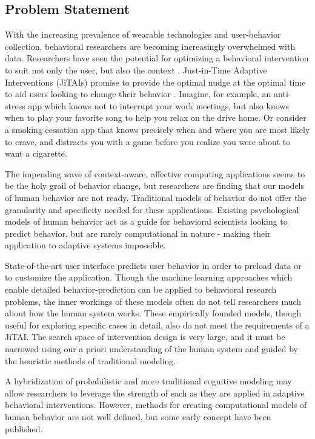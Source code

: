\documentclass[conference]{IEEEtran}
\begin{document}
\subsection{Problem Statement}
With the increasing prevalence of wearable technologies and user-behavior collection, behavioral researchers are becoming increasingly overwhelmed with data.
Researchers have seen the potential for optimizing a behavioral intervention to suit not only the user, but also the context \cite{brailsford2010towards}. 
Just-in-Time Adaptive Interventions (JiTAIs) promise to provide the optimal nudge at the optimal time to aid users looking to change their behavior \cite{nahum2014}.
Imagine, for example, an anti-stress app which knows not to interrupt your work meetings, but also knows when to play your favorite song to help you relax on the drive home.
Or consider a smoking cessation app that knows precisely when and where you are most likely to crave, and distracts you with a game before you realize you were about to want a cigarette.

The impending wave of context-aware\cite{schilit1994context}, affective computing\cite{picard2000affective} applications seems to be the holy grail of behavior change, but researchers are finding that our models of human behavior are not ready.
Traditional models of behavior do not offer the granularity and specificity needed for these applications\cite{riley2011health}.
Existing psychological models of human behavior act as a guide for behavioral scientists looking to predict behavior, but are rarely computational in nature - making their application to adaptive systems impossible.

State-of-the-art user interface predicts user behavior in order to preload data or to customize the application.
Though the machine learning approaches which enable detailed behavior-prediction can be applied to behavioral research problems, the inner workings of these models often do not tell researchers much about how the human system works. 
These empirically founded models, though useful for exploring specific cases in detail, also do not meet the requirements of a JiTAI.
The search space of intervention design is very large, and it must be narrowed using our a priori understanding of the human system and guided by the heuristic methods of traditional modeling.

A hybridization of probabilistic and more traditional cognitive modeling may allow researchers to leverage the strength of each as they are applied in adaptive behavioral interventions.
However, methods for creating computational models of human behavior are not well defined, but some early concept have been published.
\end{document}
